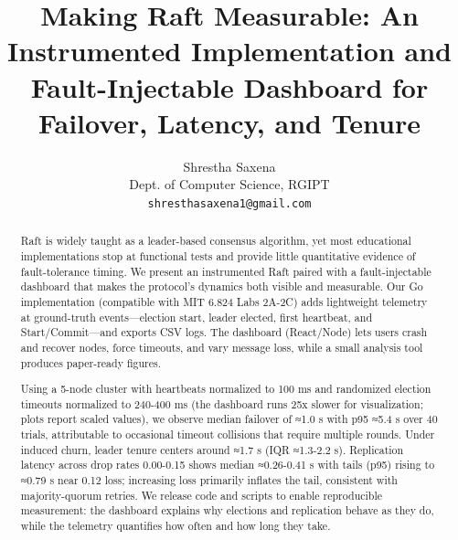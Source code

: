 \documentclass[11pt]{article}
\title{Making Raft Measurable: An Instrumented Implementation and Fault-Injectable Dashboard for Failover, Latency, and Tenure}
\author{
    Shrestha Saxena \\
    Dept. of Computer Science, RGIPT \\
    \texttt{shresthasaxena1@gmail.com} 
}
\date{}
\begin{document}
\maketitle

\begin{abstract}
Raft is widely taught as a leader-based consensus algorithm, yet most educational implementations stop at functional tests and provide little quantitative evidence of fault-tolerance timing. We present an instrumented Raft paired with a fault-injectable dashboard that makes the protocol's dynamics both visible and measurable. Our Go implementation (compatible with MIT 6.824 Labs 2A-2C) adds lightweight telemetry at ground-truth events—election start, leader elected, first heartbeat, and Start/Commit—and exports CSV logs. The dashboard (React/Node) lets users crash and recover nodes, force timeouts, and vary message loss, while a small analysis tool produces paper-ready figures.

Using a 5-node cluster with heartbeats normalized to 100 ms and randomized election timeouts normalized to 240-400 ms (the dashboard runs 25x slower for visualization; plots report scaled values), we observe median failover of ≈1.0 s with p95 ≈5.4 s over 40 trials, attributable to occasional timeout collisions that require multiple rounds. Under induced churn, leader tenure centers around ≈1.7 s (IQR ≈1.3-2.2 s). Replication latency across drop rates 0.00-0.15 shows median ≈0.26-0.41 s with tails (p95) rising to ≈0.79 s near 0.12 loss; increasing loss primarily inflates the tail, consistent with majority-quorum retries. We release code and scripts to enable reproducible measurement: the dashboard explains why elections and replication behave as they do, while the telemetry quantifies how often and how long they take.
\end{abstract}
\end{document}
